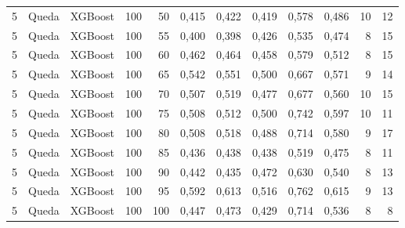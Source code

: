 \begin{longtable}{@{}rllrrrrrrrrr@{}}
5 & Queda & XGBoost & 100 & 50 & 0,415 & 0,422 & 0,419 & 0,578 & 0,486 & 10 & 12 \\
5 & Queda & XGBoost & 100 & 55 & 0,400 & 0,398 & 0,426 & 0,535 & 0,474 & 8 & 15 \\
5 & Queda & XGBoost & 100 & 60 & 0,462 & 0,464 & 0,458 & 0,579 & 0,512 & 8 & 15 \\
5 & Queda & XGBoost & 100 & 65 & 0,542 & 0,551 & 0,500 & 0,667 & 0,571 & 9 & 14 \\
5 & Queda & XGBoost & 100 & 70 & 0,507 & 0,519 & 0,477 & 0,677 & 0,560 & 10 & 15 \\
5 & Queda & XGBoost & 100 & 75 & 0,508 & 0,512 & 0,500 & 0,742 & 0,597 & 10 & 11 \\
5 & Queda & XGBoost & 100 & 80 & 0,508 & 0,518 & 0,488 & 0,714 & 0,580 & 9 & 17 \\
5 & Queda & XGBoost & 100 & 85 & 0,436 & 0,438 & 0,438 & 0,519 & 0,475 & 8 & 11 \\
5 & Queda & XGBoost & 100 & 90 & 0,442 & 0,435 & 0,472 & 0,630 & 0,540 & 8 & 13 \\
5 & Queda & XGBoost & 100 & 95 & 0,592 & 0,613 & 0,516 & 0,762 & 0,615 & 9 & 13 \\
5 & Queda & XGBoost & 100 & 100 & 0,447 & 0,473 & 0,429 & 0,714 & 0,536 & 8 & 8 \\

\end{longtable}
